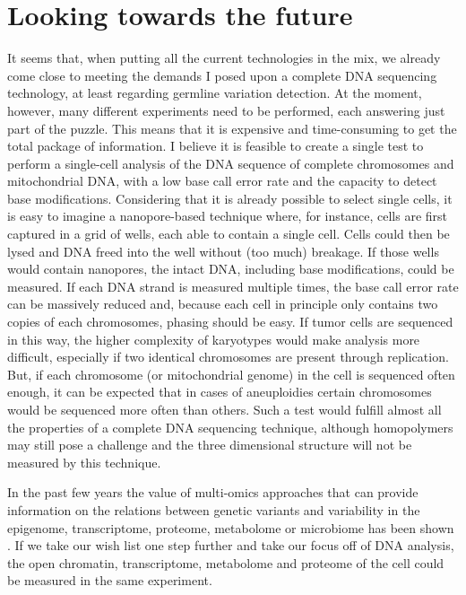 \section{Looking towards the future}
It seems that, when putting all the current technologies in the mix, we already come close to meeting the demands I posed upon a complete DNA sequencing technology, at least regarding germline
variation detection. 
At the moment, however, many different experiments need to be performed, each answering just part of the puzzle. 
This means that it is expensive and time-consuming to get the total package of information. 
I believe it is feasible to create a single test to perform a single-cell analysis of the DNA sequence of complete chromosomes and mitochondrial DNA, with a low base call error rate and the capacity to detect base modifications. 
Considering that it is already possible to select single cells, it is easy to imagine a nanopore-based technique where, for instance, cells are first captured in a grid of wells, each able to contain a single cell. 
Cells could then be lysed and DNA freed into the well without (too much) breakage. 
If those wells would contain nanopores, the intact DNA, including base modifications, could be measured. 
If each DNA strand is measured multiple times, the base call error rate can be massively reduced and, because each cell in principle only contains two copies of each chromosomes, phasing should be easy. 
If tumor cells are sequenced in this way, the higher complexity of karyotypes would make analysis more difficult, especially if two identical chromosomes are present through replication. But, if each chromosome (or mitochondrial genome) in the cell is sequenced often enough, it can be expected that in cases of aneuploidies certain chromosomes would be sequenced more often than others. 
Such a test would fulfill almost all the properties of a complete DNA sequencing technique, although homopolymers may still pose a challenge and the three dimensional structure will not be measured by this technique.

In the past few years the value of multi-omics approaches that can provide information on the relations between genetic variants and variability in the epigenome, transcriptome, proteome, metabolome or microbiome has been shown \cite{Hasin_2017}. 
If we take our wish list one step further and take our focus off of DNA analysis, the open chromatin, transcriptome, metabolome and proteome of the cell could be measured in the same experiment. 

